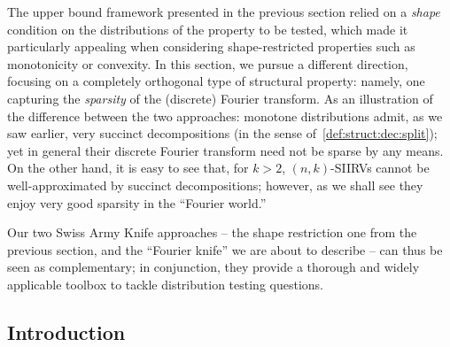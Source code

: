 The upper bound framework presented in the previous section relied on a \emph{shape} condition on the distributions of the property to be tested, which made it particularly appealing when considering shape-restricted properties such as monotonicity or convexity. In this section, we pursue a different direction, focusing on a completely orthogonal type of structural property: namely, one capturing the \emph{sparsity} of the (discrete) Fourier transform. As an illustration of the difference between the two approaches: monotone distributions admit, as we saw earlier, very succinct decompositions (in the sense of~\cref{def:struct:dec:split}); yet in general their discrete Fourier transform need not be sparse by any means. On the other hand, it is easy to see that, for $k>2$, $(n, k)$-SIIRVs cannot be well-approximated by succinct decompositions; however, as we shall see they enjoy very good sparsity in the ``Fourier world.''

Our two Swiss Army Knife approaches -- the shape restriction one from the previous section, and the ``Fourier knife'' we are about to describe -- can thus be seen as complementary; in conjunction, they provide a thorough and widely applicable toolbox to tackle distribution testing questions.

 \subsection{Introduction}  \label{sec:introduction:fourier}


